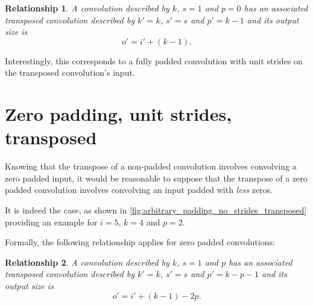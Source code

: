 \documentclass[notitlepage]{report}
\newtheorem{relationship}{Relationship}
\begin{document}
\begin{relationship}\label{rel:no_padding_no_strides_transposed}
A convolution described by $k$, $s = 1$ and $p = 0$ has an associated transposed
convolution described by $k' = k$, $s' = s$ and $p' = k - 1$ and its output size
is
\begin{equation*}
    o' = i' + (k - 1).
\end{equation*}
\end{relationship}

Interestingly, this corresponds to a fully padded convolution with unit strides
on the transposed convolution's input.

\section{Zero padding, unit strides, transposed}

Knowing that the transpose of a non-padded convolution involves convolving a
zero padded input, it would be reasonable to suppose that the transpose of a
zero padded convolution involves convolving an input padded with {\em less\/}
zeros.

It is indeed the case, as shown in
\autoref{fig:arbitrary_padding_no_strides_transposed} providing an example for
$i = 5$, $k = 4$ and $p = 2$.

Formally, the following relationship applies for zero padded convolutions:

\begin{relationship}\label{rel:arbitrary_padding_no_strides_transposed}
A convolution described by $k$, $s = 1$ and $p$ has an associated transposed
convolution described by $k' = k$, $s' = s$ and $p' = k - p - 1$ and its output
size is
\begin{equation*}
    o' = i' + (k - 1) - 2p.
\end{equation*}
\end{relationship}
\end{document}
